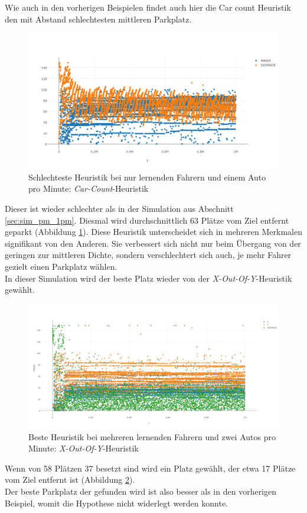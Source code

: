Wie auch in den vorherigen Beispielen findet auch hier die Car count Heuristik den mit Abstand schlechtesten mittleren Parkplatz. 
\begin{figure}
	\includegraphics[width=\textwidth]{analyse/JustHeuristik/1pm/car1just.png}
	\caption{Schlechteste Heuristik bei nur lernenden Fahrern und einem Auto pro Minute: \emph{Car-Count}-Heuristik}\label{fig:res_jh_1pm_worst}
\end{figure}
Dieser ist wieder schlechter als in der Simulation aus Abschnitt \ref{sec:sim_pm_1pm}. Diesmal wird durchschnittlich 63 Plätze vom Ziel entfernt geparkt (Abbildung \ref{fig:res_jh_1pm_worst}). Diese Heuristik unterscheidet sich in mehreren Merkmalen signifikant von den Anderen. Sie verbessert sich nicht nur beim Übergang von der geringen zur mittleren Dichte, sondern verschlechtert sich auch, je mehr Fahrer gezielt einen Parkplatz wählen.\\
In dieser Simulation wird der beste Platz wieder von der \emph{X-Out-Of-Y}-Heuristik gewählt. 
\begin{figure}
	\includegraphics[width=\textwidth]{analyse/JustHeuristik/1pm/xy.png}
	\caption{Beste Heuristik bei mehreren lernenden Fahrern und zwei Autos pro Minute: \emph{X-Out-Of-Y}-Heuristik}\label{fig:res_jh_1pm_best}
\end{figure}
Wenn von 58 Plätzen 37 besetzt sind wird ein Platz gewählt, der etwa 17 Plätze vom Ziel entfernt ist (Abbildung \ref{fig:res_jh_1pm_best}). \\
Der beste Parkplatz der gefunden wird ist also besser als in den vorherigen Beispiel, womit die Hypothese nicht widerlegt werden konnte.\\

